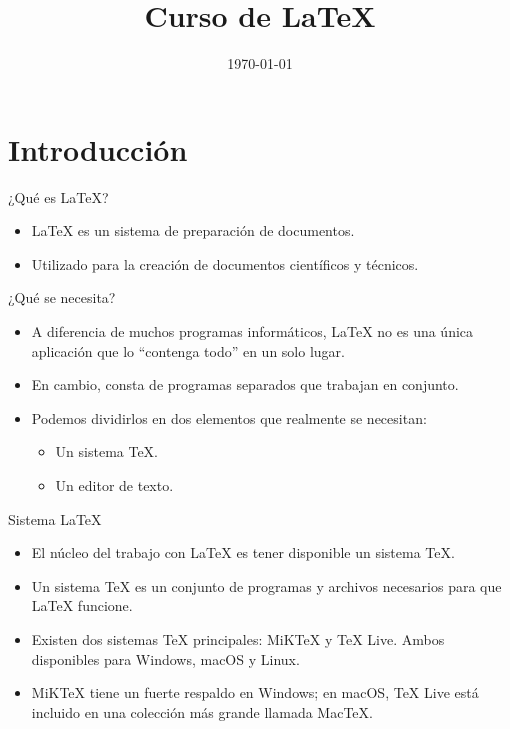 \documentclass[12pt]{beamer}
\title{Curso de \LaTeX}
\date{\today}
\begin{document}
\begin{frame}
\titlepage
\end{frame}
\begin{frame}
\tableofcontents
\end{frame}
\section{Introducción}
\begin{frame}{¿Qué es \LaTeX?}
  \begin{itemize}
    \item \LaTeX{} es un sistema de preparación de documentos.
    \item<2-> Utilizado para la creación de documentos científicos y técnicos.
  \end{itemize}
\end{frame}
\begin{frame}{¿Qué se necesita?}
  \begin{itemize}
    \item A diferencia de muchos programas informáticos, \LaTeX{} no es una única aplicación que lo ``contenga todo'' en un solo lugar.
    \item<2-> En cambio, consta de programas separados que trabajan en conjunto.
    \item<3-> Podemos dividirlos en dos elementos que realmente se necesitan:
    \begin{itemize}
      \item<4-> Un sistema TeX.
      \item<5-> Un editor de texto.
    \end{itemize}
  \end{itemize}  
\end{frame}
\begin{frame}{Sistema \LaTeX}
  \begin{itemize}
    \item<1-> El núcleo del trabajo con \LaTeX{} es tener disponible un sistema TeX. 
    \item<2-> Un sistema TeX es un conjunto de programas y archivos necesarios para que \LaTeX{} funcione.
    \item<3-> Existen dos sistemas TeX principales: MiKTeX y TeX Live. Ambos disponibles para Windows, macOS y Linux.
    \item<4-> MiKTeX tiene un fuerte respaldo en Windows; en macOS, TeX Live está incluido en una colección más grande llamada MacTeX.
  \end{itemize}
\end{frame}
\end{document}
